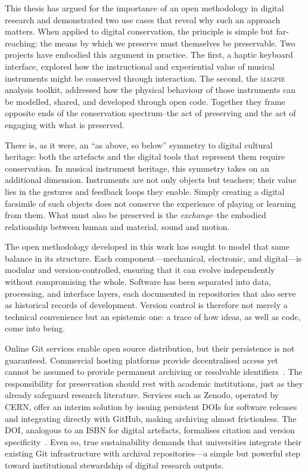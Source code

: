 This thesis has argued for the importance of an open methodology in digital research and demonstrated two use cases that reveal why such an approach matters. When applied to digital conservation, the principle is simple but far-reaching: the means by which we preserve must themselves be preservable. Two projects have embodied this argument in practice. The first, a haptic keyboard interface, explored how the instructional and experiential value of musical instruments might be conserved through interaction. The second, the \textsc{magpie} analysis toolkit, addressed how the physical behaviour of those instruments can be modelled, shared, and developed through open code. Together they frame opposite ends of the conservation spectrum--the act of preserving and the act of engaging with what is preserved.

There is, as it were, an ``as above, so below'' symmetry to digital cultural heritage: both the artefacts and the digital tools that represent them require conservation. In musical instrument heritage, this symmetry takes on an additional dimension. Instruments are not only objects but teachers; their value lies in the gestures and feedback loops they enable. Simply creating a digital facsimile of such objects does not conserve the experience of playing or learning from them. What must also be preserved is the \emph{exchange}--the embodied relationship between human and material, sound and motion.

The open methodology developed in this work has sought to model that same balance in its structure. Each component---mechanical, electronic, and digital---is modular and version-controlled, ensuring that it can evolve independently without compromising the whole. Software has been separated into data, processing, and interface layers, each documented in repositories that also serve as historical records of development. Version control is therefore not merely a technical convenience but an epistemic one: a trace of how ideas, as well as code, come into being.

Online Git services enable open source distribution, but their persistence is not guaranteed. Commercial hosting platforms provide decentralised access yet cannot be assumed to provide permanent archiving or resolvable identifiers~\cite{calano_github_2025}. The responsibility for preservation should rest with academic institutions, just as they already safeguard research literature. Services such as Zenodo, operated by CERN, offer an interim solution by issuing persistent DOIs for software releases and integrating directly with GitHub, making archiving almost frictionless. The DOI, analogous to an ISBN for digital artefacts, formalises citation and version specificity~\cite{soito_citations_2016}. Even so, true sustainability demands that universities integrate their existing Git infrastructure with archival repositories---a simple but powerful step toward institutional stewardship of digital research outputs.

